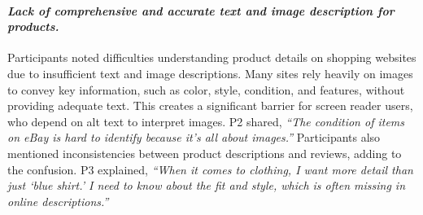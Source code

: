 \paragraph{\textbf{\textit{Lack of comprehensive and accurate text and image description for products.}}}
Participants noted difficulties understanding product details on shopping websites due to insufficient text and image descriptions. Many sites rely heavily on images to convey key information, such as color, style, condition, and features, without providing adequate text. This creates a significant barrier for screen reader users, who depend on alt text to interpret images. P2 shared, \textit{``The condition of items on eBay is hard to identify because it's all about images.''} Participants also mentioned inconsistencies between product descriptions and reviews, adding to the confusion. P3 explained, \textit{``When it comes to clothing, I want more detail than just `blue shirt.' I need to know about the fit and style, which is often missing in online descriptions.''}


